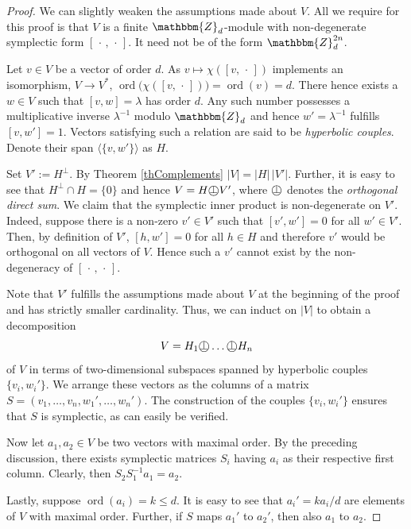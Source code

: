 \documentclass[aps,twocolumn,floatfix]{revtex4}
\def\tuple#1.{\langle#1\rangle}
\def\ZZ{\mathbbm{Z}}
\def\spacedot{\,\cdot\,}
\newcommand{\operp}{\ensuremath{\text{\textcircled{$\perp$}}}}
\DeclareMathOperator{\ord}{ord}
\begin{document}
\begin{proof}
	We can slightly weaken the assumptions made about $V$. All we
	require for this proof is that $V$ is a finite $\ZZ_d$-module 
	with non-degenerate symplectic form $[\spacedot,\spacedot]$. It need
	not be of the form $\ZZ_d^{2n}$. 
	
	Let $v\in V$ be a vector of order $d$. As $v\mapsto
	\chi([v,\spacedot])$ implements an isomorphism, $V\to V^*$,
	$\ord\big(\chi([v,\spacedot])\big)=\ord(v)=d$. There hence exists a
	$w\in V$ such that $[v,w]=\lambda$ has order $d$. Any such number
	possesses a multiplicative inverse $\lambda^{-1}$ modulo $\ZZ_d$ and
	hence $w'=\lambda^{-1}$ fulfills $[v,w']=1$. Vectors satisfying such
	a relation are said to be \emph{hyperbolic couples}.  Denote their
	span $\tuple \{v,w'\}.$ as $H$.

	Set $V':=H^\bot$. By Theorem \ref{thComplements} $|V|=|H|\,|V'|$.
	Further, it is easy to see that $H^\bot\cap H=\{0\}$ and hence
	$V=H\operp V'$, where $\operp$ denotes the \emph{orthogonal direct
	sum}.  We claim that the symplectic inner product is non-degenerate
	on $V'$. Indeed, suppose there is a non-zero $v'\in V'$ such that
	$[v',w']=0$ for all $w'\in V'$. Then, by definition of $V'$,
	$[h,w']=0$ for all $h\in H$ and therefore $v'$ would be orthogonal 
	on all vectors of $V$. Hence such a $v'$ cannot exist by the
	non-degeneracy of $[\spacedot,\spacedot]$.

	Note that $V'$ fulfills the assumptions made about $V$ at the beginning
	of the proof and has strictly smaller cardinality. Thus, we can
	induct on $|V|$ to obtain a decomposition
	\begin{equation*}
		V=H_1\operp\dots\operp H_n
	\end{equation*}
	of $V$ in terms of two-dimensional subspaces spanned by hyperbolic
	couples $\{v_i, w_i'\}$.
	We arrange these vectors as the columns of a matrix
	$S=(v_1,\dots,v_n,w_1',\dots,w_n')$. The construction of the couples
	$\{v_i, w_i'\}$ ensures that $S$ is symplectic, as can easily be
	verified. 

	Now let $a_1, a_2\in V$ be two vectors with maximal order. By the
	preceding discussion, there exists symplectic matrices $S_i$ having
	$a_i$ as their respective first column. Clearly, then $S_2 S_1^{-1}
	a_1 = a_2$.

	Lastly, suppose $\ord(a_i)=k\leq d$. It is easy to see that
	$a_i'={k a_i}/d$ are elements of $V$ with maximal order. Further, if
	$S$ maps $a_1'$ to $a_2'$, then also $a_1$ to $a_2$.
\end{proof}
\end{document}
